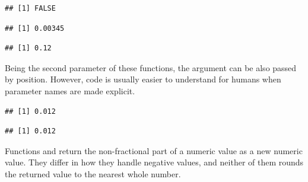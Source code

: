 \documentclass[krantz2]{krantz}\usepackage{knitr}%
\begin{document}
\begin{knitrout}
\begin{kframe}
\begin{alltt}
 \hlopt{==} 
\end{alltt}
\begin{verbatim}
## [1] FALSE
\end{verbatim}
\begin{alltt}
 \hlopt{-} 
\end{alltt}
\begin{verbatim}
## [1] 0.00345
\end{verbatim}
\begin{alltt}
\end{alltt}
\begin{verbatim}
## [1] 0.12
\end{verbatim}
\end{kframe}
\end{knitrout}

\begin{explainbox}
Being  the second parameter of these functions, the argument can be also passed by position. However, code is usually easier to understand for humans when parameter names are made explicit.

\begin{knitrout}\footnotesize
{}\color{fgcolor}\begin{kframe}
\begin{alltt}
\hlstd{(}\hlstd{,}  \hlstd{=} \hlstd{)}
\end{alltt}
\begin{verbatim}
## [1] 0.012
\end{verbatim}
\begin{alltt}
\hlstd{(}\hlstd{,} \hlstd{)}
\end{alltt}
\begin{verbatim}
## [1] 0.012
\end{verbatim}
\end{kframe}
\end{knitrout}
\end{explainbox}

Functions  and  return the non-fractional part of a numeric value as a new numeric value. They differ in how they handle negative values, and neither of them rounds the returned value to the nearest whole number.
\end{document}

